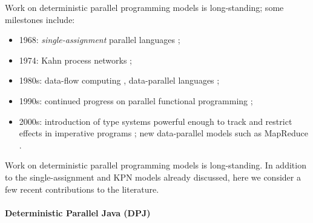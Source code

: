 
Work on deterministic parallel programming
models is long-standing; some milestones include:

\begin{itemize}
\item 1968: {\em single-assignment} parallel languages \cite{Tesler-1968};
\item 1974: Kahn process networks \cite{Kahn-1974};
\item 1980s: data-flow computing \cite{IStructures}, data-parallel
              languages \cite{Sabot_Paralation};
\item 1990s: continued progress on parallel functional programming 
      \cite{ph,blelloch_something,hammond_par_90s};
\item 2000s: introduction of type systems powerful enough to track
  and restrict effects in imperative programs \cite{par_by_default};
  new data-parallel models such as MapReduce \cite{MapReduce}.
\end{itemize}
\fi{}

Work on deterministic parallel programming
models is long-standing.
In addition to the single-assignment and KPN models already
discussed, here we consider a few recent contributions to the literature.

\paragraph{Deterministic Parallel Java (DPJ)}


